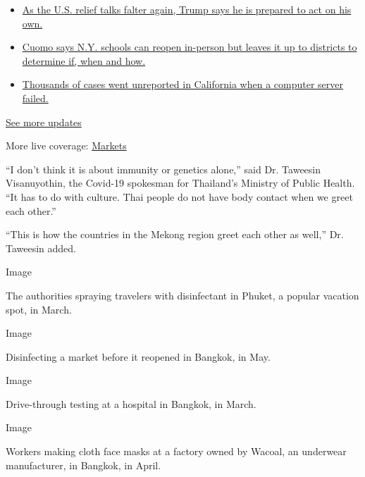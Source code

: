 \begin{itemize}
\tightlist
\item
  \href{https://www.nytimes.com/2020/08/07/world/covid-19-news.html?action=click\&pgtype=Article\&state=default\&region=MAIN_CONTENT_1\&context=storylines_live_updates\#link-1f86d03a}{As
  the U.S. relief talks falter again, Trump says he is prepared to act
  on his own.}
\item
  \href{https://www.nytimes.com/2020/08/07/world/covid-19-news.html?action=click\&pgtype=Article\&state=default\&region=MAIN_CONTENT_1\&context=storylines_live_updates\#link-3f64a70a}{Cuomo
  says N.Y. schools can reopen in-person but leaves it up to districts
  to determine if, when and how.}
\item
  \href{https://www.nytimes.com/2020/08/07/world/covid-19-news.html?action=click\&pgtype=Article\&state=default\&region=MAIN_CONTENT_1\&context=storylines_live_updates\#link-14e70066}{Thousands
  of cases went unreported in California when a computer server failed.}
\end{itemize}

\href{https://www.nytimes.com/2020/08/07/world/covid-19-news.html?action=click\&pgtype=Article\&state=default\&region=MAIN_CONTENT_1\&context=storylines_live_updates}{See
more updates}

More live coverage:
\href{https://www.nytimes.com/live/2020/08/07/business/stock-market-today-coronavirus?action=click\&pgtype=Article\&state=default\&region=MAIN_CONTENT_1\&context=storylines_live_updates}{Markets}

``I don't think it is about immunity or genetics alone,'' said Dr.
Taweesin Visanuyothin, the Covid-19 spokesman for Thailand's Ministry of
Public Health. ``It has to do with culture. Thai people do not have body
contact when we greet each other.''

``This is how the countries in the Mekong region greet each other as
well,'' Dr. Taweesin added.

Image

The authorities spraying travelers with disinfectant in Phuket, a
popular vacation spot, in March.

Image

Disinfecting a market before it reopened in Bangkok, in May.

Image

Drive-through testing at a hospital in Bangkok, in March.

Image

Workers making cloth face masks at a factory owned by Wacoal, an
underwear manufacturer, in Bangkok, in April.

